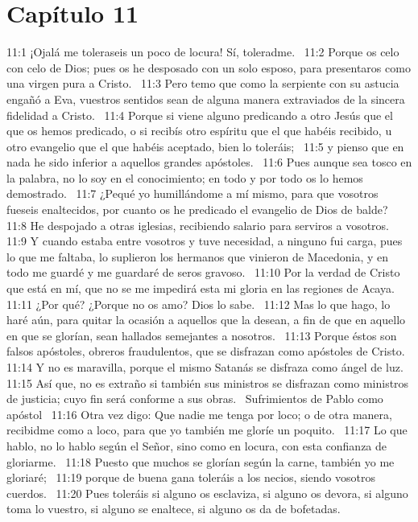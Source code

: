 \section*{Capítulo 11 }

11:1 ¡Ojalá me toleraseis un poco de locura! Sí, toleradme.  
11:2 Porque os celo con celo de Dios; pues os he desposado con un solo esposo, para presentaros como una virgen pura a Cristo.  
11:3 Pero temo que como la serpiente con su astucia engañó a Eva, vuestros sentidos sean de alguna manera extraviados de la sincera fidelidad a Cristo.  
11:4 Porque si viene alguno predicando a otro Jesús que el que os hemos predicado, o si recibís otro espíritu que el que habéis recibido, u otro evangelio que el que habéis aceptado, bien lo toleráis;  
11:5 y pienso que en nada he sido inferior a aquellos grandes apóstoles.  
11:6 Pues aunque sea tosco en la palabra, no lo soy en el conocimiento; en todo y por todo os lo hemos demostrado.  
11:7 ¿Pequé yo humillándome a mí mismo, para que vosotros fueseis enaltecidos, por cuanto os he predicado el evangelio de Dios de balde?  
11:8 He despojado a otras iglesias, recibiendo salario para serviros a vosotros.  
11:9 Y cuando estaba entre vosotros y tuve necesidad, a ninguno fui carga, pues lo que me faltaba, lo suplieron los hermanos que vinieron de Macedonia, y en todo me guardé y me guardaré de seros gravoso.  
11:10 Por la verdad de Cristo que está en mí, que no se me impedirá esta mi gloria en las regiones de Acaya.  
11:11 ¿Por qué? ¿Porque no os amo? Dios lo sabe.  
11:12 Mas lo que hago, lo haré aún, para quitar la ocasión a aquellos que la desean, a fin de que en aquello en que se glorían, sean hallados semejantes a nosotros.  
11:13 Porque éstos son falsos apóstoles, obreros fraudulentos, que se disfrazan como apóstoles de Cristo.  
11:14 Y no es maravilla, porque el mismo Satanás se disfraza como ángel de luz.  
11:15 Así que, no es extraño si también sus ministros se disfrazan como ministros de justicia; cuyo fin será conforme a sus obras.  
Sufrimientos de Pablo como apóstol  
11:16 Otra vez digo: Que nadie me tenga por loco; o de otra manera, recibidme como a loco, para que yo también me gloríe un poquito.  
11:17 Lo que hablo, no lo hablo según el Señor, sino como en locura, con esta confianza de gloriarme.  
11:18 Puesto que muchos se glorían según la carne, también yo me gloriaré;  
11:19 porque de buena gana toleráis a los necios, siendo vosotros cuerdos.  
11:20 Pues toleráis si alguno os esclaviza, si alguno os devora, si alguno toma lo vuestro, si alguno se enaltece, si alguno os da de bofetadas.  
